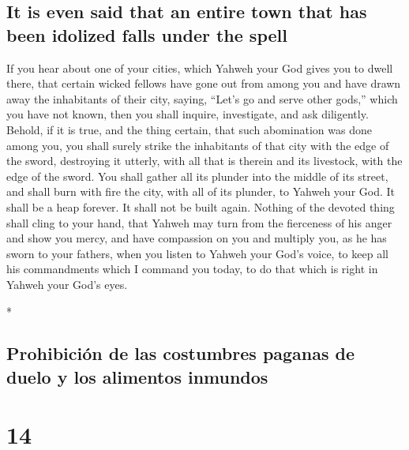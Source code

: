 \begin{paracol}{2}
\begin{otherlanguage}{english}
\hypertarget{it-is-even-said-that-an-entire-town-that-has-been-idolized-falls-under-the-spell}{%
\subsection{It is even said that an entire town that has been idolized
falls under the
spell}\label{it-is-even-said-that-an-entire-town-that-has-been-idolized-falls-under-the-spell}}

 If you hear about one of your cities, which Yahweh your
God gives you to dwell there, that  certain wicked
fellows have gone out from among you and have drawn away the inhabitants
of their city, saying, ``Let's go and serve other gods,'' which you have
not known,  then you shall inquire, investigate, and ask
diligently. Behold, if it is true, and the thing certain, that such
abomination was done among you,  you shall surely strike
the inhabitants of that city with the edge of the sword, destroying it
utterly, with all that is therein and its livestock, with the edge of
the sword.  You shall gather all its plunder into the
middle of its street, and shall burn with fire the city, with all of its
plunder, to Yahweh your God. It shall be a heap forever. It shall not be
built again.  Nothing of the devoted thing shall cling to
your hand, that Yahweh may turn from the fierceness of his anger and
show you mercy, and have compassion on you and multiply you, as he has
sworn to your fathers,  when you listen to Yahweh your
God's voice, to keep all his commandments which I command you today, to
do that which is right in Yahweh your God's eyes.

\end{otherlanguage}

\switchcolumn[0]*

\hypertarget{prohibiciuxf3n-de-las-costumbres-paganas-de-duelo-y-los-alimentos-inmundos}{%
\subsection{Prohibición de las costumbres paganas de duelo y los
alimentos
inmundos}\label{prohibiciuxf3n-de-las-costumbres-paganas-de-duelo-y-los-alimentos-inmundos}}

\hypertarget{section-26}{%
\section{14}\label{section-26}}


\end{paracol}
